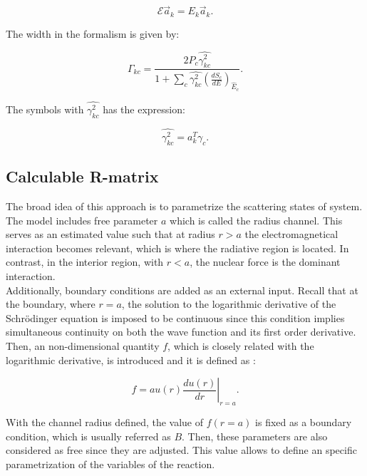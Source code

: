 \documentclass[openany]{book}
\begin{document}
\begin{equation}\label{eq:rmatrix_E_values}
	\mathcal{E}\vec a_k = E_k \vec a_k.
\end{equation}

The width in the formalism is given by:

\begin{equation}\label{eq:rmatrix_width}
	\Gamma_{kc} = \frac{2P_c \hat {{\gamma}^2_{kc}}}{1 + \sum_{c}{\hat {{\gamma}^2_{kc}} \left(\frac{dS_c}{dE}\right)_{\hat{E}_c}  }}.
\end{equation}

The symbols with $\hat {{\gamma}^2_{kc}}$ has the expression: 

\begin{equation}\label{eq:rmatrix_width_reduced}
	\hat {{\gamma}^2_{kc}} = a^{T}_{k} \gamma_c.
\end{equation}



\subsection{Calculable R-matrix} \label{sub:rmatrix_calculable}

The broad idea of this approach is to parametrize the scattering states of system.  The model includes free parameter $a$ which is called the radius channel. This serves as an estimated value such that at radius $r > a$ the electromagnetical interaction becomes relevant, which is where the radiative region is located. In contrast, in the interior region, with $r < a$, the nuclear force is the dominant interaction. \\

Additionally, boundary conditions are added as an external input. Recall that at the boundary, where $r = a$, the solution to the logarithmic derivative of the Schrödinger equation is imposed to be continuous since this condition implies simultaneous continuity on both the wave function and its first order derivative. Then, an non-dimensional quantity $f$, which is closely related with the logarithmic derivative, is introduced and it is defined as \cite{iliadis_2015}:

\begin{equation}\label{eq:rmatrix_f}
	f = a\left.u(r) \frac{du(r)}{dr}\right|_{r = a}.
\end{equation}

With the channel radius defined, the value of $f(r = a)$ is fixed as a boundary condition, which is usually referred as $B$.  Then, these parameters are also considered as free since they are adjusted. This value allows to define an specific parametrization of the variables of the reaction. \\
\end{document}
